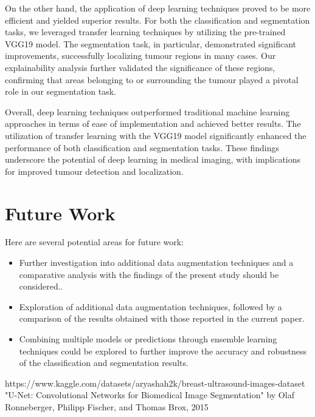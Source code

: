 On the other hand, the application of deep learning techniques proved to be more efficient and yielded superior results. For both the classification and segmentation tasks, we leveraged transfer learning techniques by utilizing the pre-trained VGG19 model. The segmentation task, in particular, demonstrated significant improvements, successfully localizing tumour regions in many cases. Our explainability analysis further validated the significance of these regions, confirming that areas belonging to or surrounding the tumour played a pivotal role in our segmentation task.

Overall, deep learning techniques outperformed traditional machine learning approaches in terms of ease of implementation and achieved better results. The utilization of transfer learning with the VGG19 model significantly enhanced the performance of both classification and segmentation tasks. These findings underscore the potential of deep learning in medical imaging, with implications for improved tumour detection and localization.

\section{Future Work}
Here are several potential areas for future work:
\begin{itemize}
\item Further investigation into additional data augmentation techniques and a comparative analysis with the findings of the present study should be considered..
\item Exploration of additional data augmentation techniques, followed by a comparison of the results obtained with those reported in the current paper.
\item Combining multiple models or predictions through ensemble learning techniques could be explored to further improve the accuracy and robustness of the classification and segmentation results.
\end{itemize}

\begin{thebibliography}{00}
 https://www.kaggle.com/datasets/aryashah2k/breast-ultrasound-images-dataset
 "U-Net: Convolutional Networks for Biomedical Image Segmentation" by Olaf Ronneberger, Philipp Fischer, and Thomas Brox, 2015
\end{thebibliography}
\vspace{12pt}
\color{red}
